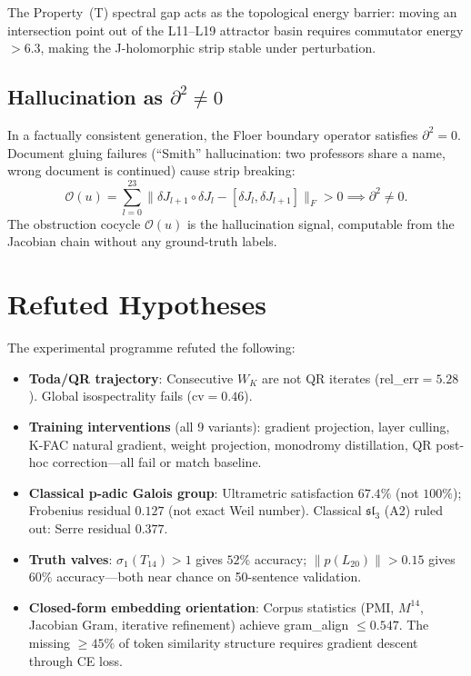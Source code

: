 \documentclass[11pt,a4paper]{article}
\begin{document}
The Property~(T) spectral gap acts as the topological energy barrier:
moving an intersection point out of the L11--L19 attractor basin requires
commutator energy ${>}6.3$, making the J-holomorphic strip stable under
perturbation.

\subsection{Hallucination as $\partial^2 \neq 0$}

In a factually consistent generation, the Floer boundary operator satisfies
$\partial^2 = 0$.  Document gluing failures (``Smith'' hallucination:
two professors share a name, wrong document is continued) cause strip
breaking:
\[
\mathcal{O}(u) = \sum_{l=0}^{23} \|\delta J_{l+1} \circ \delta J_l
  - [\delta J_l, \delta J_{l+1}]\|_F > 0 \implies \partial^2 \neq 0.
\]
The obstruction cocycle $\mathcal{O}(u)$ is the hallucination signal,
computable from the Jacobian chain without any ground-truth labels.

\section{Refuted Hypotheses}
\label{sec:refuted}

The experimental programme refuted the following:

\begin{itemize}
  \item \textbf{Toda/QR trajectory}: Consecutive $W_K$ are not QR iterates
        (rel\_err${=}5.28$).  Global isospectrality fails (cv${=}0.46$).
  \item \textbf{Training interventions} (all 9 variants): gradient projection,
        layer culling, K-FAC natural gradient, weight projection, monodromy
        distillation, QR post-hoc correction---all fail or match baseline.
  \item \textbf{Classical p-adic Galois group}: Ultrametric satisfaction
        $67.4\%$ (not $100\%$); Frobenius residual $0.127$ (not exact Weil number).
        Classical $\mathfrak{sl}_3$ (A2) ruled out: Serre residual $0.377$.
  \item \textbf{Truth valves}: $\sigma_1(T_{14})>1$ gives $52\%$ accuracy;
        $\|p(L_{20})\|>0.15$ gives $60\%$ accuracy---both near chance on
        50-sentence validation.
  \item \textbf{Closed-form embedding orientation}: Corpus statistics
        (PMI, $M^{14}$, Jacobian Gram, iterative refinement) achieve
        gram\_align $\leq 0.547$. The missing $\geq 45\%$ of token
        similarity structure requires gradient descent through CE loss.
\end{itemize}
\end{document}
